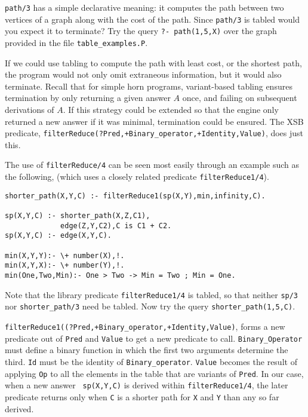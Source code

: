 \begin{exercise}
{\tt path/3} has a simple declarative meaning: it computes the path
between two vertices of a graph along with the cost of the path.
Since {\tt path/3} is tabled would you expect it to terminate?  Try
the query {\tt ?- path(1,5,X)} over the graph provided in the file
{\tt table\_examples.P}.
\end{exercise}

If we could use tabling to compute the path with least cost, or the
shortest path, the program would not only omit extraneous information,
but it would also terminate.  Recall that for simple horn programs,
variant-based tabling ensures termination by only returning a given
answer $A$ once, and failing on subsequent derivations of $A$\@.  If
this strategy could be extended so that the engine only returned a new
answer if it was minimal, termination could be ensured.  The XSB
predicate, {\tt filterReduce(?Pred,+Binary\_operator,+Identity,Value)},
does just this.  

\begin{exercise}
The use of {\tt filterReduce/4} can be seen most easily through an
example such as the following, (which uses a closely related predicate
{\tt filterReduce1/4}).
\begin{center}
\begin{minipage}{3.8in}
\begin{verbatim}
shorter_path(X,Y,C) :- filterReduce1(sp(X,Y),min,infinity,C).

sp(X,Y,C) :- shorter_path(X,Z,C1),
             edge(Z,Y,C2),C is C1 + C2.
sp(X,Y,C) :- edge(X,Y,C).

min(X,Y,Y):- \+ number(X),!.
min(X,Y,X):- \+ number(Y),!.
min(One,Two,Min):- One > Two -> Min = Two ; Min = One.
\end{verbatim}						       
\end{minipage}
\end{center}
Note that the library predicate {\tt filterReduce1/4} is tabled, so
that neither {\tt sp/3} nor {\tt shorter\_path/3} need be tabled.  Now
try the query {\tt shorter\_path(1,5,C)}.
\end{exercise}

{\tt filterReduce1((?Pred,+Binary\_operator,+Identity,Value)}, forms a
new predicate out of {\tt Pred} and {\tt Value} to get a new predicate
to call.  {\tt Binary\_Operator} must define a binary function in
which the first two arguments determine the third.  {\tt Id} must be
the identity of {\tt Binary\_operator}.  {\tt Value} becomes the
result of applying {\tt Op} to all the elements in the table that are
variants of {\tt Pred}.  In our case, when a new answer {\tt
sp(X,Y,C)} is derived within {\tt filterReduce1/4}, the later
predicate returns only when {\tt C} is a shorter  path for {\tt X} and
{\tt Y} than any so far derived.

